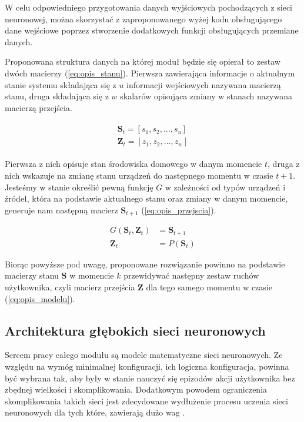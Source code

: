 W celu odpowiedniego przygotowania danych wyjściowych pochodzących z sieci neuronowej, można skorzystać z zaproponowanego wyżej kodu obsługującego dane wejściowe poprzez stworzenie dodatkowych funkcji obsługujących przemiane danych. %

Proponowana struktura danych na której moduł będzie się opierał to zestaw dwóch macierzy (\ref{eq:opis_stanu}). Pierwsza zawierająca informacje o aktualnym stanie systemu składająca się z $u$ informacji wejściowych nazywana macierzą stanu, druga składająca się z $w$ skalarów opisująca zmiany w stanach nazywana macierzą przejścia. 

\begin{align}
    \begin{split}
        \mathbf{S}_t = \left[s_1, s_2, \dots, s_u\right] \\
        \mathbf{Z}_t = \left[z_1, z_2, \dots, z_w\right]
    \end{split}
    \label{eq:opis_stanu}
\end{align}


Pierwsza z nich opisuje stan środowiska domowego w danym momencie $t$, druga z nich wskazuje na zmianę stanu urządzeń do następnego momentu w czasie $t+1$. Jesteśmy w stanie określić pewną funkcję $G$ w zależności od typów urządzeń i źródeł, która na podstawie aktualnego stanu oraz zmiany w danym momencie, generuje nam następną macierz $\mathbf{S}_{t+1}$ (\ref{eq:opis_przejscia}).

\begin{align}
    G\left(\mathbf{S}_t, \mathbf{Z}_t\right) &= \mathbf{S}_{t+1} \label{eq:opis_przejscia} \\
    \mathbf{Z}_t &= P(\mathbf{S}_t) \label{eq:opis_modelu}
\end{align}

Biorąc powyższe pod uwagę, proponowane rozwiązanie powinno na podstawie macierzy stanu $\mathbf{S}$ w momencie $k$ przewidywać następny zestaw ruchów użytkownika, czyli macierz przejścia $\mathbf{Z}$ dla tego samego momentu w czasie (\ref{eq:opis_modelu}).

\subsection{Architektura głębokich sieci neuronowych}
Sercem pracy całego modułu są modele matematyczne sieci neuronowych. Ze względu na wymóg minimalnej konfiguracji, ich logiczna konfiguracja, powinna być wybrana tak, aby były w stanie nauczyć się epizodów akcji użytkownika bez zbędnej wielkości i skomplikowania. Dodatkowym powodem ograniczenia skomplikowania takich sieci jest zdecydowane wydłużenie procesu uczenia sieci neuronowych dla tych które, zawierają dużo wag \cite{time_complexity_nn}.

